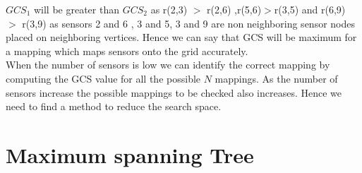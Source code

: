 $GCS_{1}$ will be greater than $GCS_{2}$ as r(2,3) $>$ r(2,6) ,r(5,6)$>$r(3,5) and r(6,9) $>$ r(3,9) as sensors 2 and 6 , 3 and 5, 3 and 9 are non neighboring sensor nodes placed on neighboring vertices. Hence we can say that GCS will be maximum for a  mapping which maps sensors onto the grid accurately.\\
When the number of sensors is low we can identify the correct mapping by computing the GCS value for all the possible $N$ mappings. As the number of sensors increase the possible mappings to be checked also increases. Hence we need to find a method to reduce the search space.

\section{Maximum spanning Tree}

